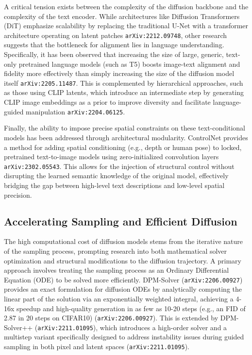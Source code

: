 \documentclass[11pt]{article}
\begin{document}
A critical tension exists between the complexity of the diffusion backbone and the complexity of the text encoder. While architectures like Diffusion Transformers (DiT) emphasize scalability by replacing the traditional U-Net with a transformer architecture operating on latent patches \texttt{arXiv:2212.09748}, other research suggests that the bottleneck for alignment lies in language understanding. Specifically, it has been observed that increasing the size of large, generic, text-only pretrained language models (such as T5) boosts image-text alignment and fidelity more effectively than simply increasing the size of the diffusion model itself \texttt{arXiv:2205.11487}. This is complemented by hierarchical approaches, such as those using CLIP latents, which introduce an intermediate step by generating CLIP image embeddings as a prior to improve diversity and facilitate language-guided manipulation \texttt{arXiv:2204.06125}.

Finally, the ability to impose precise spatial constraints on these text-conditional models has been addressed through architectural modularity. ControlNet provides a method for adding spatial conditioning (e.g., depth or human pose) to locked, pretrained text-to-image models using zero-initialized convolution layers \texttt{arXiv:2302.05543}. This allows for the injection of structural control without disrupting the learned semantic knowledge of the original model, effectively bridging the gap between high-level text descriptions and low-level spatial precision.

\subsection{Accelerating Sampling and Efficient Diffusion}

The high computational cost of diffusion models stems from the iterative nature of the sampling process, prompting research into both mathematical solver optimization and structural modifications to the diffusion trajectory. A primary approach involves treating the sampling process as an Ordinary Differential Equation (ODE) to be solved more efficiently. DPM-Solver (\texttt{arXiv:2206.00927}) provides an exact formulation for diffusion ODEs by analytically computing the linear part of the solution via an exponentially weighted integral, achieving a 4-16x speedup and high-quality generation in as few as 10-20 steps (e.g., an FID of 2.87 in 20 steps on CIFAR10) (\texttt{arXiv:2206.00927}). This is extended by DPM-Solver++ (\texttt{arXiv:2211.01095}), which introduces a high-order solver and a multistep variant specifically designed to address instability issues during guided sampling in both pixel and latent spaces (\texttt{arXiv:2211.01095}).
\end{document}
